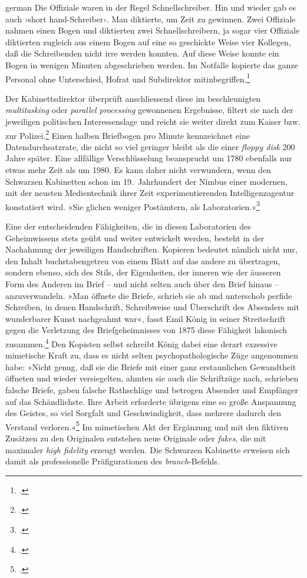 \documentclass[a4paper,10pt]{article}
\newcommand{\anf}[1]{»#1«}
\newcommand{\inanf}[1]{›#1‹}
\newenvironment{zitat}{
\begin{foreigndisplayquote}{german}}%
{\end{foreigndisplayquote}}
\begin{document}
\begin{zitat}
Die Offiziale waren in der Regel Schnellschreiber. Hin und wieder gab es auch \inanf{short hand-Schreiber}. Man diktierte, um Zeit zu gewinnen. Zwei Offiziale nahmen einen Bogen und diktierten zwei Schnellschreibern, ja sogar vier Offiziale diktierten zugleich aus einem Bogen auf eine so geschickte Weise vier Kollegen, daß die Schreibenden nicht irre werden konnten. Auf diese Weise konnte ein Bogen in wenigen Minuten abgeschrieben werden. Im Notfalle kopierte das ganze Personal ohne Unterschied, Hofrat und Subdirektor mitinbegriffen.\footcite[139]{stix:1937}
\end{zitat}
Der Kabinettsdirektor überprüft anschliessend diese im beschleunigten \emph{multitasking} oder \emph{parallel processing} gewonnenen Ergebnisse, filtert sie nach der jeweiligen politischen Interessenslage und reicht sie weiter direkt zum Kaiser bzw. zur Polizei.\footcite[140]{stix:1937} Einen halben Briefbogen pro Minute kennzeichnet eine Datendurchsatzrate, die nicht so viel geringer bleibt als die einer \emph{floppy disk} 200 Jahre später. Eine allfällige Verschlüsselung beansprucht um 1780 ebenfalls nur etwas mehr Zeit als um 1980. Es kann daher nicht verwundern, wenn den Schwarzen Kabinetten schon im 19.~Jahrhundert der Nimbus einer modernen, mit der neusten Medientechnik ihrer Zeit experimentierenden Intelligenzagentur konstatiert wird. \anf{Sie glichen weniger Postämtern, als Laboratorien.}\footcite[40]{koenig:1875}

Eine der entscheidenden Fähigkeiten, die in diesen Laboratorien des Geheimwissens stets geübt und weiter entwickelt werden, besteht in der Nachahmung der jeweiligen Handschriften. Kopieren bedeutet nämlich nicht nur, den Inhalt buchstabengetreu von einem Blatt auf das andere zu übertragen, sondern ebenso, sich des Stils, der Eigenheiten, der inneren wie der äusseren Form des Anderen im Brief – und nicht selten auch über den Brief hinaus – anzuverwandeln. \anf{Man öffnete die Briefe, schrieb sie ab und unterschob perfide Schreiben, in denen Handschrift, Schreibweise und Überschrift des Absenders mit wunderbarer Kunst nachgeahmt war}, fasst Emil König in seiner Streitschrift gegen die Verletzung des Briefgeheimnisses von 1875 diese Fähigkeit lakonisch zusammen.\footcite[34]{koenig:1875} Den Kopisten selbst schreibt König dabei eine derart exzessive mimetische Kraft zu, dass es nicht selten psychopathologische Züge angenommen habe: \anf{Nicht genug, daß sie die Briefe mit einer ganz erstaunlichen Gewandtheit öffneten und wieder versiegelten, ahmten sie auch die Schriftzüge nach, schrieben falsche Briefe, gaben falsche Rathschläge und betrogen Absender und Empfänger auf das Schändlichste. Ihre Arbeit erforderte übrigens eine so große Anspannung des Geistes, so viel Sorgfalt und Geschwindigkeit, dass mehrere dadurch den Verstand verloren.}\footcite[38]{koenig:1875} Im mimetischen Akt der Ergänzung und mit den fiktiven Zusätzen zu den Originalen entstehen neue Originale oder \emph{fakes}, die mit maximaler \emph{high fidelity} erzeugt werden. Die Schwarzen Kabinette erweisen sich damit als professionelle Präfigurationen des \emph{branch}-Befehls.
\end{document}
